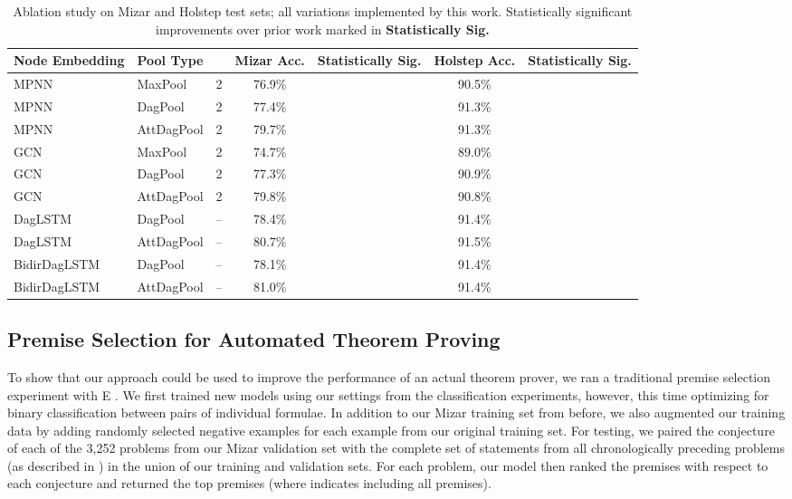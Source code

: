 \documentclass{article}
\begin{document}
\begin{table}[t]
\centering
\caption{Ablation study on Mizar and Holstep test sets; all variations implemented by this work. Statistically significant improvements over prior work marked in \textbf{Statistically Sig.}
}
\vskip 0.1in
\label{res:exp_abl}
\footnotesize
\setlength\tabcolsep{4pt}\begin{tabular}{ l l c !{\vrule} c c !{\vrule} c c }
\toprule 
  \textbf{Node Embedding} & \textbf{Pool Type} &  & \textbf{Mizar Acc.} & \textbf{Statistically Sig.} & \textbf{Holstep Acc.} & \textbf{Statistically Sig.}  \\
\midrule
MPNN & MaxPool & 2 & 76.9\% & & 90.5\%  &  \\ 
  MPNN & DagPool & 2 & 77.4\% &  & 91.3\%  &  \\ 
  MPNN & AttDagPool & 2 & 79.7\% &  & 91.3\% &  \\ 
GCN & MaxPool & 2 & 74.7\% & & 89.0\% & \\ 
GCN & DagPool & 2 & 77.3\% &  & 90.9\%  &  \\ 
  GCN & AttDagPool & 2 & 79.8\% &  & 90.8\% &  \\ 
DagLSTM & DagPool & -- & 78.4\% &  & 91.4\% &  \\ 
DagLSTM & AttDagPool & -- & 80.7\% &  & 91.5\% &   \\ 
BidirDagLSTM & DagPool & -- & 78.1\% &  & 91.4\%  &   \\ 
BidirDagLSTM & AttDagPool & -- & 81.0\% &  & 91.4\% &  \\ 
\bottomrule
\end{tabular}
\vspace{-0.1in}
\end{table}


\subsection{Premise Selection for Automated Theorem Proving}
\label{sec:E}
To show that our approach could be used to improve the performance of an actual theorem prover, we ran a traditional premise selection experiment with E \cite{schulz2013system}. We first trained new models using our settings from the classification experiments, however, this time optimizing for binary classification between pairs of individual formulae. In addition to our Mizar training set from before, we also augmented our training data by adding randomly selected negative examples for each example from our original training set. For testing, we paired the conjecture of each of the 3,252 problems from our Mizar validation set with the complete set of statements from all chronologically preceding problems (as described in \cite{irving2016deepmath}) in the union of our training and validation sets. For each problem, our model then ranked the premises with respect to each conjecture and returned the top  premises (where  indicates including all premises).
\end{document}
